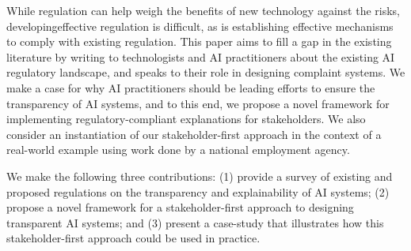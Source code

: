 While regulation can help weigh the benefits of new technology against the risks, developingeffective regulation is difficult, as is establishing effective mechanisms to comply with existing regulation. This paper aims to fill a gap in the existing literature by writing to technologists and AI practitioners about the existing AI regulatory landscape, and speaks to their role in designing complaint systems. We make a case for why AI practitioners should be leading efforts to ensure the transparency of AI systems, and to this end, we propose a novel framework for implementing regulatory-compliant explanations for stakeholders. We also consider an instantiation of our stakeholder-first approach in the context of a real-world example using work done by a national employment agency.

We make the following three contributions: (1) provide a survey of existing and proposed regulations on the transparency and explainability of AI systems; (2) propose a novel framework for a stakeholder-first approach to designing transparent AI systems; and (3) present a case-study that illustrates how this stakeholder-first approach could be used in practice.



